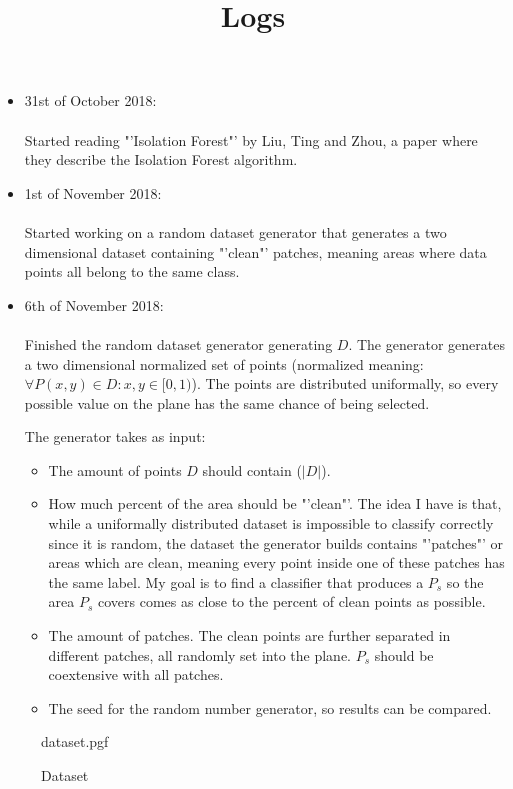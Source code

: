 \documentclass[12pt]{article}
\title{Logs}
\date{}
\begin{document}
\maketitle

\begin{itemize}

  \item 31st of October 2018: \\ \\
    Started reading "'Isolation Forest"' by Liu, Ting and
    Zhou, a paper where they describe the Isolation Forest
    algorithm.

  \item 1st of November 2018: \\ \\
    Started working on a random dataset generator that
    generates a two dimensional dataset containing
    "'clean"' patches, meaning areas where data points all
    belong to the same class.

  \item 6th of November 2018: \\ \\
    Finished the random dataset generator generating $D$.
    The generator generates a two dimensional normalized
    set of points (normalized meaning:
    $\forall P(x,y) \in D: x, y \in [0,1)$). The points are
    distributed uniformally, so every possible value on the
    plane has the same chance of being selected.

    The generator takes as input:
      \begin{itemize}

        \item The amount of points $D$ should contain
              ($|D|$).

        \item How much percent of the area should be
              "'clean"'. The idea I have is that, while a
              uniformally distributed dataset is impossible
              to classify correctly since it is random, the
              dataset the generator builds contains
              "'patches"' or areas which are clean, meaning
              every point inside one of these patches has
              the same label. My goal is to find a
              classifier that produces a $P_s$ so the area
              $P_s$ covers comes as close to the percent of
              clean points as possible.

        \item The amount of patches. The clean points are
              further separated in different patches, all
              randomly set into the plane. $P_s$ should be
              coextensive with all patches.

        \item The seed for the random number generator, so
              results can be compared.

      \end{itemize}

\end{itemize}

\begin{figure}
  \begin{center}
    {dataset.pgf}
  \end{center}
  \caption{Dataset}
\end{figure}
\end{document}
